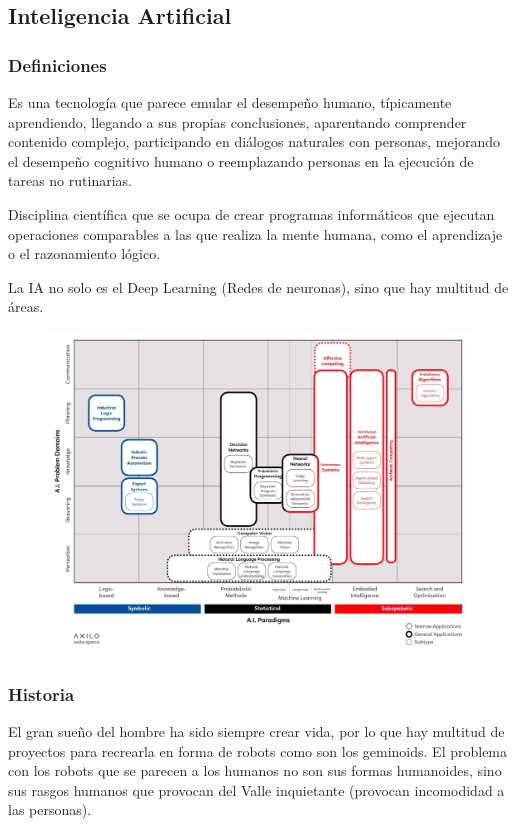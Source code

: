 \documentclass[12pt, twoside, openright]{report} %
\begin{document}
\subsection{Inteligencia Artificial}
\subsubsection{Definiciones}
Es una tecnología que parece emular el desempeño humano, típicamente aprendiendo, llegando a sus propias conclusiones, aparentando comprender contenido complejo, participando en diálogos naturales con personas, mejorando el desempeño cognitivo humano o reemplazando personas en la ejecución de tareas no rutinarias.

Disciplina científica que se ocupa de crear programas informáticos que ejecutan operaciones comparables a las que realiza la mente humana, como el aprendizaje o el razonamiento lógico.

La IA no solo es el Deep Learning (Redes de neuronas), sino que hay multitud de áreas.
\begin{figure}[H]
	{\includegraphics[scale=.23]{areas-ia.jpg}}
\end{figure}

\subsubsection{Historia}
El gran sueño del hombre ha sido siempre crear vida, por lo que hay multitud de proyectos para recrearla en forma de robots como son los geminoids. El problema con los robots que se parecen a los humanos no son sus formas humanoides, sino sus rasgos humanos que provocan del Valle inquietante (provocan incomodidad a las personas).
\end{document}
